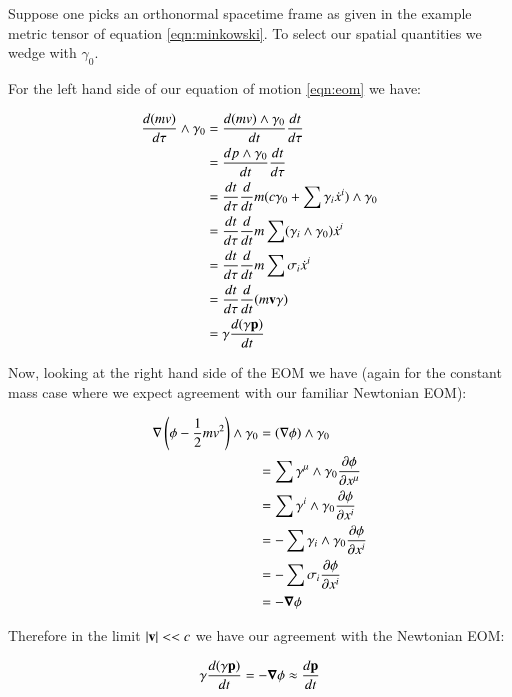 \documentclass{article}      %
\newcommand{\grad}[0]{\nabla}
\newcommand{\PD}[2]{\frac{\partial {#2}}{\partial {#1}}}
\newcommand{\xdot}[0]{\dot{x}}
\newcommand{\spacegrad}[0]{\boldsymbol{\nabla}}
\begin{document}
Suppose one picks an orthonormal
spacetime frame as given in the example metric tensor of equation \ref{eqn:minkowski}.  To select our spatial quantities
we wedge with $\gamma_0$.

For the left hand side of our equation of motion \ref{eqn:eom} we have:

\begin{align*}
\frac{d (m v)}{d\tau} \wedge \gamma_0 
&= \frac{ d (m v) \wedge \gamma_0 }{dt} \frac{dt}{d\tau} \\
&= \frac{ d p \wedge \gamma_0 }{dt} \frac{dt}{d\tau} \\
&= \frac{dt}{d\tau} \frac{ d }{dt} m (c \gamma_0 + \sum \gamma_i \xdot^i ) \wedge \gamma_0 \\
&= \frac{dt}{d\tau} \frac{ d }{dt} m \sum (\gamma_i \wedge \gamma_0) \xdot^i  \\
&= \frac{dt}{d\tau} \frac{ d }{dt} m \sum \sigma_i \xdot^i  \\
&= \frac{dt}{d\tau} \frac{ d }{dt} (m \Bv \gamma) \\
&= \gamma \frac{ d (\gamma \Bp) }{dt}
\end{align*}

Now, looking at the right hand side of the EOM we have (again for the constant mass case where we expect agreement with our familiar Newtonian EOM):

\begin{align*}
\grad \left(\phi - \inv{2} m v^2 \right) \wedge \gamma_0 
&= (\grad \phi) \wedge \gamma_0 \\
&= \sum \gamma^{\mu} \wedge \gamma_0 \PD{x^{\mu}}{\phi} \\
&= \sum \gamma^{i} \wedge \gamma_0 \PD{x^{i}}{\phi} \\
&= -\sum \gamma_{i} \wedge \gamma_0 \PD{x^{i}}{\phi} \\
&= -\sum \sigma_i \PD{x^{i}}{\phi} \\
&= - \spacegrad \phi
\end{align*}

Therefore in the limit $\lvert{\mathbf{v}}\rvert << c$ we have our agreement with the Newtonian EOM:

\begin{equation}
\gamma \frac{ d (\gamma \Bp) }{dt} = - \spacegrad \phi \approx \frac{d\Bp}{dt}
\end{equation}
\end{document}
